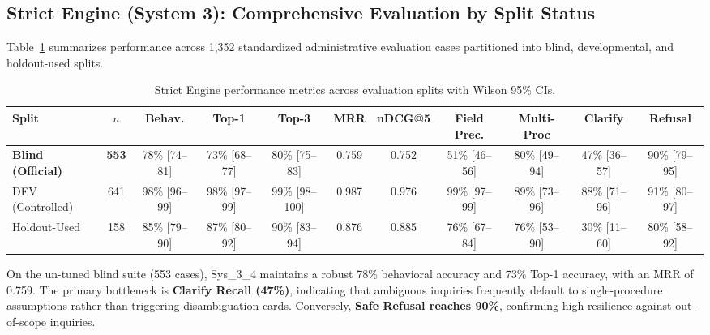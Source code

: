 \documentclass[11pt,a4paper]{article}
\newcommand{\sys}{\mbox{Sys\_3\_4}}
\begin{document}
\subsection{Strict Engine (System 3): Comprehensive Evaluation by Split Status}
Table~\ref{tab:split} summarizes performance across 1,352 standardized administrative evaluation cases
partitioned into blind, developmental, and holdout-used splits.

\begin{table}[htbp]
\centering
\caption{Strict Engine performance metrics across evaluation splits with Wilson 95\% CIs.}
\label{tab:split}
\footnotesize
\begin{adjustbox}{max width=\textwidth}
\begin{tabular}{@{}lcccccccccc@{}}
\toprule
\textbf{Split} & \textbf{$n$} & \textbf{Behav.} & \textbf{Top-1} & \textbf{Top-3} & \textbf{MRR} &
\textbf{nDCG@5} & \textbf{Field Prec.} & \textbf{Multi-Proc} & \textbf{Clarify} & \textbf{Refusal}\\
\midrule
\textbf{Blind (Official)} & \textbf{553} & 78\% [74--81] & 73\% [68--77] & 80\% [75--83] & 0.759 &
0.752 & 51\% [46--56] & 80\% [49--94] & 47\% [36--57] & 90\% [79--95]\\
DEV (Controlled) & 641 & 98\% [96--99] & 98\% [97--99] & 99\% [98--100] & 0.987 & 0.976 & 99\% [97--99]
& 89\% [73--96] & 88\% [71--96] & 91\% [80--97]\\
Holdout-Used & 158 & 85\% [79--90] & 87\% [80--92] & 90\% [83--94] & 0.876 & 0.885 & 76\% [67--84] &
76\% [53--90] & 30\% [11--60] & 80\% [58--92]\\
\bottomrule
\end{tabular}
\end{adjustbox}
\end{table}

On the un-tuned blind suite (553 cases), \sys{} maintains a robust 78\% behavioral accuracy and 73\%
Top-1 accuracy, with an MRR of 0.759. The primary bottleneck is \textbf{Clarify Recall (47\%)},
indicating that ambiguous inquiries frequently default to single-procedure assumptions rather than
triggering disambiguation cards. Conversely, \textbf{Safe Refusal reaches 90\%}, confirming high
resilience against out-of-scope inquiries.
\end{document}
